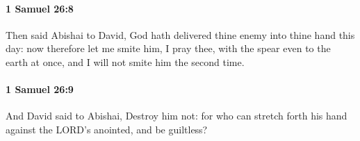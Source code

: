 		\paragraph{1 Samuel 26:8} %
			\label{1SAMUEL-26-8}

			Then said Abishai to David, God hath delivered thine enemy into thine hand this day: now therefore let me smite him, I pray thee, with the spear even to the earth at once, and I will not smite him the second time.


		\paragraph{1 Samuel 26:9} %
			\label{1SAMUEL-26-9}

			And David said to Abishai, Destroy him not: for who can stretch forth his hand against the LORD’s anointed, and be guiltless?


